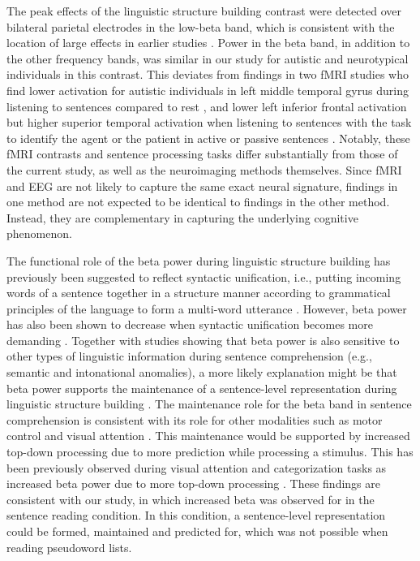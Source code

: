 The peak effects of the linguistic structure building contrast were detected over bilateral parietal electrodes in the low-beta band, which is consistent with the location of large effects in earlier studies \citep{bastiaansen2010,bastiaansen2015}. Power in the beta band, in addition to the other frequency bands, was similar in our study for autistic and neurotypical individuals in this contrast. This deviates from findings in two fMRI studies who find lower activation for autistic individuals in left middle temporal gyrus during listening to sentences compared to rest \citep{muller1999}, and lower left inferior frontal activation but higher superior temporal activation when listening to sentences with the task to identify the agent or the patient in active or passive sentences \citep{just2004}. Notably, these fMRI contrasts and sentence processing tasks differ substantially from those of the current study, as well as the neuroimaging methods themselves. Since fMRI and EEG are not likely to capture the same exact neural signature, findings in one method are not expected to be identical to findings in the other method. Instead, they are complementary in capturing the underlying cognitive phenomenon.

The functional role of the beta power during linguistic structure building has previously been suggested to reflect syntactic unification, i.e., putting incoming words of a sentence together in a structure manner according to grammatical principles of the language to form a multi-word utterance \citep{bastiaansen2010,bastiaansen2015}. However, beta power has also been shown to decrease when syntactic unification becomes more demanding \citep{lewis2023}. Together with studies showing that beta power is also sensitive to other types of linguistic information during sentence comprehension (e.g., semantic and intonational anomalies), a more likely explanation might be that beta power supports the maintenance of a sentence-level representation during linguistic structure building \citep{lewis2016}. The maintenance role for the beta band in sentence comprehension is consistent with its role for other modalities such as motor control and visual attention \citep{engel2010}. This maintenance would be supported by increased top-down processing due to more prediction while processing a stimulus. This has been previously observed during visual attention and categorization tasks as increased beta power due to more top-down processing \citep{limanowski2020,antzoulatos2016}. These findings are consistent with our study, in which increased beta was observed for in the sentence reading condition. In this condition, a sentence-level representation could be formed, maintained and predicted for, which was not possible when reading pseudoword lists. 

